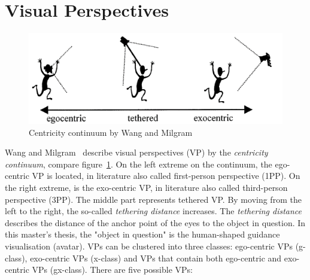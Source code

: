\section{Visual Perspectives}
\label{section:visual_perspectives}
\begin{figure}[H]
	\centering
	\includegraphics[width=\textwidth]{figures/ego_exo_continuum.PNG}
	\caption[Centricity continuum]{Centricity continuum by Wang and Milgram~\cite{centricitycontinuum}}
	\label{fig:ego-exo-continuum}
\end{figure}
Wang and Milgram~\cite{centricitycontinuum} describe visual perspectives (VP) by the \textit{centricity continuum}, compare figure~\ref{fig:ego-exo-continuum}. On the left extreme on the continuum, the ego-centric VP is located, in literature also called first-person perspective (1PP). On the right extreme, is the exo-centric VP, in literature also called third-person perspective (3PP). The middle part represents tethered VP. By moving from the left to the right, the so-called \textit{tethering distance} increases. The \textit{tethering distance} describes the distance of the anchor point of the eyes to the object in question. In this master's thesis, the "object in question" is the human-shaped guidance visualisation (avatar). VPs can be clustered into three classes: ego-centric VPs (g-class), exo-centric VPs (x-class) and VPs that contain both ego-centric and exo-centric VPs (gx-class). There are five possible VPs:%
